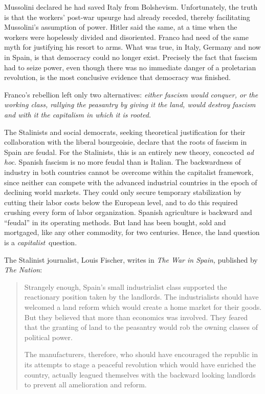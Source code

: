 Mussolini declared he had saved Italy from Bolshevism. Unfortunately, the truth is that the workers’ post-war upsurge had already receded, thereby facilitating Mussolini’s assumption of power. Hitler said the same, at a time when the workers were hopelessly divided and disoriented. Franco had need of the same myth for justifying his resort to arms. What was true, in Italy, Germany and now in Spain, is that democracy could no longer exist. Precisely the fact that fascism had to seize power, even though there was no immediate danger of a proletarian revolution, is the most conclusive evidence that democracy was finished.

Franco’s rebellion left only two alternatives: \emph{either fascism would conquer, or the working class, rallying the peasantry by giving it the land, would destroy fascism and with it the capitalism in which it is rooted.}

The Stalinists and social democrats, seeking theoretical justification for their collaboration with the liberal bourgeoisie, declare that the roots of fascism in Spain are feudal. For the Stalinists, this is an entirely new theory, concocted \emph{ad hoc}. Spanish fascism is no more feudal than is Italian. The backwardness of industry in both countries cannot be overcome within the capitalist framework, since neither can compete with the advanced industrial countries in the epoch of declining world markets. They could only secure temporary stabilization by cutting their labor costs below the European level, and to do this required crushing every form of labor organization. Spanish agriculture is backward and ``feudal'' in its operating methods. But land has been bought, sold and mortgaged, like any other commodity, for two centuries. Hence, the land question is a \emph{capitalist}~question.

The Stalinist journalist, Louis Fischer,{\indexLFischer} writes in \emph{The War in Spain,} published by \emph{The Nation}:

\begin{quotation}
  \sloppy
  
  Strangely enough, Spain’s small industrialist class supported the reactionary position taken by the landlords. The industrialists should have welcomed a land reform which would create a home market for their goods. But they believed that more than economics was involved. They feared that the granting of land to the peasantry would rob the owning classes of political power.
  
  The manufacturers, therefore, who should have encouraged the republic in its attempts to stage a peaceful revolution which would have enriched the country, actually leagued themselves with the backward looking landlords to prevent all amelioration and reform.
\end{quotation}

